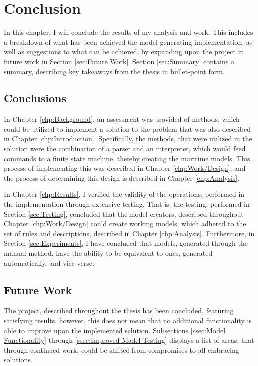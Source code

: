 \chapter{Conclusion}
In this chapter, I will conclude the results of my analysis and work. This includes a breakdown of what has been achieved the model-generating implementation, as well as suggestions to what can be achieved, by expanding upon the project in future work in Section \ref{sec:Future Work}. Section \ref{sec:Summary} contains a summary, describing key takeaways from the thesis in bullet-point form.
\section{Conclusions}
In Chapter \ref{chp:Background}, an assessment was provided of methods, which could be utilized to implement a solution to the problem that was also described in Chapter \ref{chp:Introduction}. Specifically, the methods, that were utilized in the solution were the combination of a parser and an interpreter, which would feed commands to a finite state machine, thereby creating the maritime models. This process of implementing this was described in Chapter \ref{chp:Work/Design}, and the process of determining this design is described in Chapter \ref{chp:Analysis}.

In Chapter \ref{chp:Results}, I verified the validity of the operations, performed in the implementation through extensive testing. That is, the testing, performed in Section \ref{sec:Testing}, concluded that the model creators, described throughout Chapter \ref{chp:Work/Design} could create working models, which adhered to the set of rules and descriptions, described in Chapter \ref{chp:Analysis}. Furthermore, in Section \ref{sec:Experiments}, I have concluded that models, generated through the manual method, have the ability to be equivalent to ones, generated automatically, and vice verse.
\section{Future Work}
The project, described throughout the thesis has been concluded, featuring satisfying results, however, this does not mean that no additional functionality is able to improve upon the implemented solution. Subsections \ref{ssec:Model Functionality} through \ref{ssec:Improved Model-Testing} displays a list of areas, that through continued work, could be shifted from compromises to all-embracing solutions.

